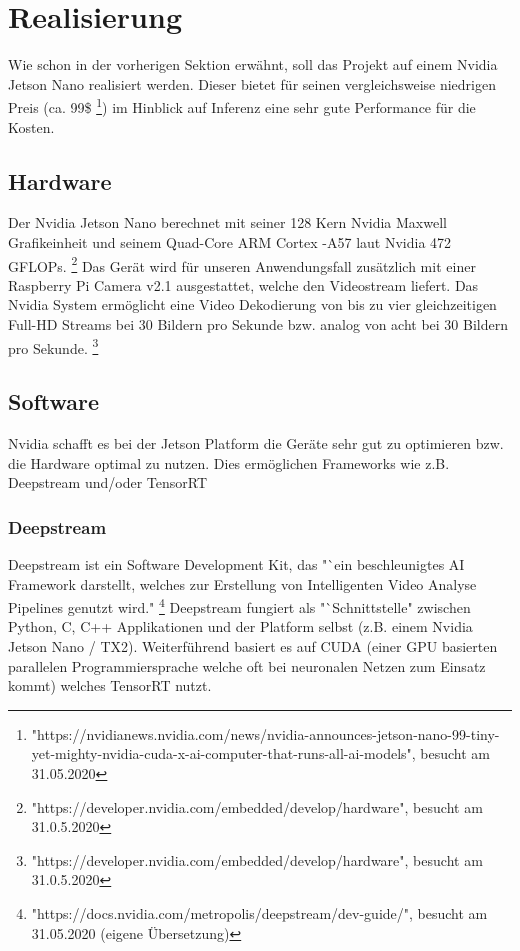 \documentclass[a4paper,oneside,12pt]{report}
\begin{document}
	\chapter{Realisierung}
	\begin{onehalfspace}
		Wie schon in der vorherigen Sektion erwähnt, soll das Projekt auf einem Nvidia Jetson Nano realisiert werden. Dieser bietet für seinen vergleichsweise niedrigen Preis (ca. 99\$
		\footnote{"https://nvidianews.nvidia.com/news/nvidia-announces-jetson-nano-99-tiny-yet-mighty-nvidia-cuda-x-ai-computer-that-runs-all-ai-models", besucht am 31.05.2020})
		im Hinblick auf Inferenz eine sehr gute Performance für die Kosten.
		\section{Hardware}
		Der Nvidia Jetson Nano berechnet mit seiner 128 Kern Nvidia Maxwell Grafikeinheit und seinem Quad-Core ARM Cortex -A57 laut Nvidia 472 GFLOPs.
		\footnote{"https://developer.nvidia.com/embedded/develop/hardware", besucht am 31.0.5.2020}
		Das Gerät wird für unseren Anwendungsfall zusätzlich mit einer Raspberry Pi Camera v2.1 ausgestattet, welche den Videostream liefert. Das Nvidia System ermöglicht eine Video Dekodierung von bis zu vier gleichzeitigen Full-HD Streams bei 30 Bildern pro Sekunde bzw. analog von acht bei 30 Bildern pro Sekunde.
		\footnote{"https://developer.nvidia.com/embedded/develop/hardware", besucht am 31.0.5.2020}
		\section{Software}
		Nvidia schafft es bei der Jetson Platform die Geräte sehr gut zu optimieren bzw. die Hardware optimal zu nutzen. Dies ermöglichen Frameworks wie z.B. Deepstream und/oder TensorRT
		\subsection{Deepstream}
		Deepstream ist ein Software Development Kit, das "`ein beschleunigtes AI Framework darstellt, welches zur Erstellung von Intelligenten Video Analyse Pipelines genutzt wird."
		\footnote{"https://docs.nvidia.com/metropolis/deepstream/dev-guide/", besucht am 31.05.2020 (eigene Übersetzung)}
		Deepstream fungiert als "`Schnittstelle" zwischen Python, C, C++ Applikationen und der Platform selbst (z.B. einem Nvidia Jetson Nano / TX2).
		Weiterführend basiert es auf CUDA (einer GPU basierten parallelen Programmiersprache welche oft bei neuronalen Netzen zum Einsatz kommt) welches TensorRT nutzt.

\end{onehalfspace}
\end{document}
